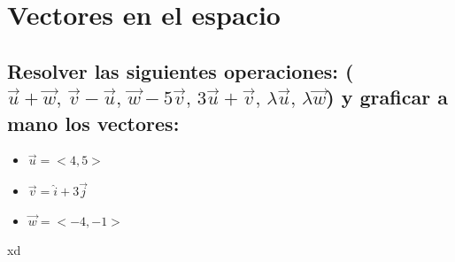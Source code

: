 \documentclass[letterpaper, 12pt]{article}
\begin{document}
\setcounter{page}{1}
\thispagestyle{fancy}
\section{Vectores en el espacio}
\subsection*{Resolver las siguientes operaciones: (\(\vec{u}+\vec{w},\,\vec{v}-\vec{u},\,\vec{w}-5\vec{v},\,3\vec{u}+\vec{v},\,\lambda\vec{u},\,\lambda\vec{w}\)) y graficar a mano los vectores:}
\begin{itemize}
    \item \(\vec{u}=<4,5>\)
    \item \(\vec{v}=\hat{i}+3\vec{j}\)
    \item \(\vec{w}=<-4,-1>\)
\end{itemize}
xd
\end{document}
